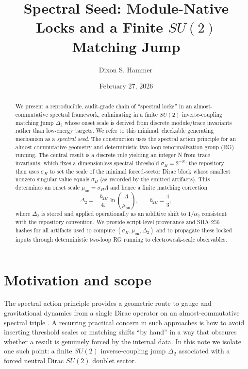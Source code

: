 \documentclass[11pt]{article}
\title{Spectral Seed: Module-Native Locks and a Finite \texorpdfstring{$SU(2)$}{SU(2)} Matching Jump}
\author{Dixon S. Hammer\,\orcidlink{0009-0003-8960-8484}}
\date{February 27, 2026}
\begin{document}
\maketitle

\begin{abstract}
We present a reproducible, audit-grade chain of ``spectral locks'' in an almost-commutative spectral framework, culminating in a finite $SU(2)$ inverse-coupling matching jump $\Delta_2$ whose onset scale is derived from discrete module/trace invariants rather than low-energy targets. We refer to this minimal, checkable generating mechanism as a \emph{spectral seed}. The construction uses the spectral action principle for an almost-commutative geometry and deterministic two-loop renormalization group (RG) running. The central result is a discrete rule yielding an integer N from trace invariants, which fixes a dimensionless spectral threshold $\sigma_H = 2^{-N}$; the repository then uses $\sigma_H$ to set the scale of the minimal forced-sector Dirac block whose smallest nonzero singular value equals $\sigma_H$ (as recorded by the emitted artifacts). This determines an onset scale $\mu_{\mathrm{on}}=\sigma_H \Lambda$ and hence a finite matching correction
\[
\Delta_2 = -\frac{b_{2H}}{4\pi}\ln\!\left(\frac{\Lambda}{\mu_{\mathrm{on}}}\right),
\qquad b_{2H}=\frac{4}{3},
\]
where $\Delta_2$ is stored and applied operationally as an additive shift to $1/\alpha_2$ consistent with the repository convention. We provide script-level provenance and SHA-256 hashes for all artifacts used to compute $(\sigma_H,\mu_{\mathrm{on}},\Delta_2)$ and to propagate these locked inputs through deterministic two-loop RG running to electroweak-scale observables.
\end{abstract}

\tableofcontents

\section{Motivation and scope}
The spectral action principle provides a geometric route to gauge and gravitational dynamics from a single Dirac operator on an almost-commutative spectral triple \cite{ChamseddineConnes1996,ChamseddineConnes1997}.
A recurring practical concern in such approaches is how to avoid inserting threshold scales or matching shifts ``by hand'' in a way that obscures whether a result is genuinely forced by the internal data. In this note we isolate one such point: a finite $SU(2)$ inverse-coupling jump $\Delta_2$ associated with a forced neutral Dirac $SU(2)$ doublet sector.
\end{document}

